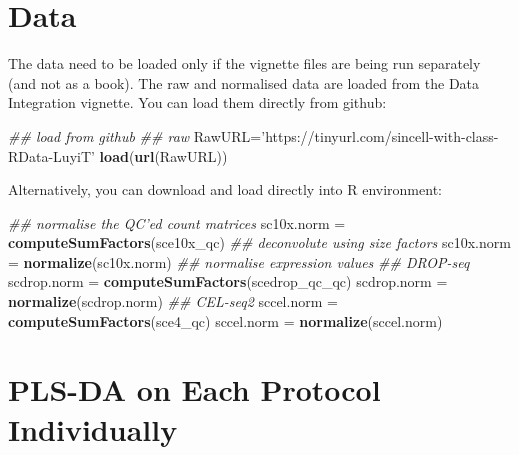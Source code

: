 \documentclass[]{book}
\newenvironment{Shaded}{\begin{snugshade}}{\end{snugshade}}
\newcommand{\CommentTok}[1]{\textcolor[rgb]{0.56,0.35,0.01}{\textit{#1}}}
\newcommand{\KeywordTok}[1]{\textcolor[rgb]{0.13,0.29,0.53}{\textbf{#1}}}
\newcommand{\NormalTok}[1]{#1}
\newcommand{\OperatorTok}[1]{\textcolor[rgb]{0.81,0.36,0.00}{\textbf{#1}}}
\newcommand{\StringTok}[1]{\textcolor[rgb]{0.31,0.60,0.02}{#1}}
\theoremstyle{definition}
\theoremstyle{definition}
\theoremstyle{definition}
\theoremstyle{remark}
\begin{document}
\hypertarget{data-1}{%
\section{Data}\label{data-1}}

The data need to be loaded only if the vignette files are being run
separately (and not as a book). The raw and normalised data are loaded
from the Data Integration vignette. You can load them directly from
github:

\begin{Shaded}
\begin{Highlighting}[]
\CommentTok{## load from github}
\CommentTok{## raw}
\NormalTok{RawURL=}\StringTok{'https://tinyurl.com/sincell-with-class-RData-LuyiT'}
\KeywordTok{load}\NormalTok{(}\KeywordTok{url}\NormalTok{(RawURL))}
\end{Highlighting}
\end{Shaded}

Alternatively, you can download and load directly into R environment:

\begin{Shaded}
\end{Shaded}

\begin{Shaded}
\begin{Highlighting}[]
\CommentTok{## normalise the QC'ed count matrices}
\NormalTok{sc10x.norm =}\StringTok{  }\KeywordTok{computeSumFactors}\NormalTok{(sce10x_qc) }\CommentTok{## deconvolute using size factors}
\NormalTok{sc10x.norm =}\StringTok{  }\KeywordTok{normalize}\NormalTok{(sc10x.norm) }\CommentTok{## normalise expression values}
\CommentTok{## DROP-seq}
\NormalTok{scdrop.norm =}\StringTok{ }\KeywordTok{computeSumFactors}\NormalTok{(scedrop_qc_qc)}
\NormalTok{scdrop.norm =}\StringTok{ }\KeywordTok{normalize}\NormalTok{(scdrop.norm)}
\CommentTok{## CEL-seq2}
\NormalTok{sccel.norm =}\StringTok{  }\KeywordTok{computeSumFactors}\NormalTok{(sce4_qc)}
\NormalTok{sccel.norm =}\StringTok{  }\KeywordTok{normalize}\NormalTok{(sccel.norm)}
\end{Highlighting}
\end{Shaded}

\hypertarget{pls-da-on-each-protocol-individually}{%
\section{PLS-DA on Each Protocol
Individually}\label{pls-da-on-each-protocol-individually}}
\end{document}
